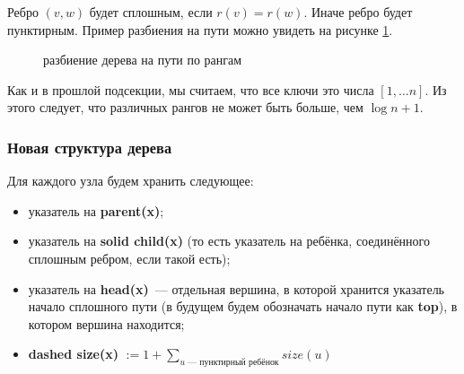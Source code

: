 
Ребро $(v, w)$ будет сплошным, если $r(v) = r(w)$. Иначе ребро будет пунктирным. Пример разбиения на пути можно увидеть на рисунке \ref{merge rank}.
\begin{figure}[h]
\caption{разбиение дерева на пути по рангам}
\label{merge rank}
\end{figure}

Как и в прошлой подсекции, мы считаем, что все ключи это числа $[1,\dots n].$ Из этого следует, что различных рангов не может быть больше, чем $\log{n} + 1.$
\subsubsection{Новая структура дерева}
Для каждого узла будем хранить следующее:
\begin{itemize}
    \item указатель на \textbf{parent(x)};
    \item указатель на \textbf{solid child(x)} (то есть указатель на ребёнка, соединённого сплошным ребром, если такой есть);
    \item указатель на \textbf{head(x)}~--- отдельная вершина, в которой хранится указатель начало сплошного пути (в будущем будем обозначать начало пути как \textbf{top}), в котором вершина находится;
    \item \textbf{dashed size(x)} $:= 1 + \sum\limits_{u \text{~--- пунктирный ребёнок}}size(u)$
\end{itemize}


